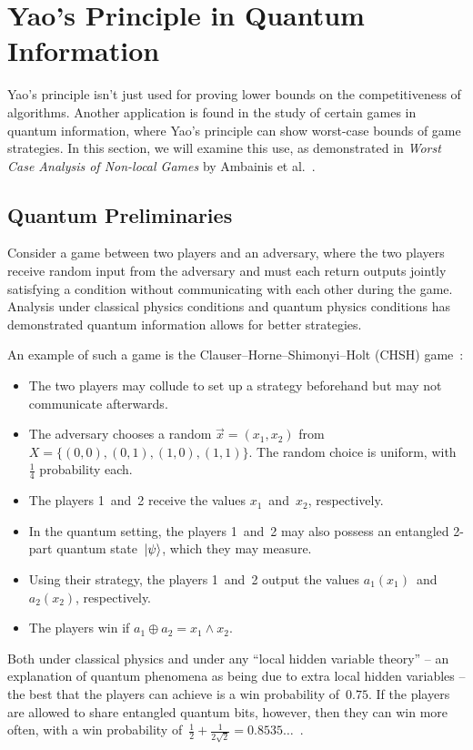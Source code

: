 \newcommand{\Mid}{\nobreak\mid\nobreak}

\section{Yao's Principle in Quantum Information}

Yao's principle isn't just used for proving lower bounds on the competitiveness of algorithms. Another application is found in the study of certain games in quantum information, where Yao's principle can show worst-case bounds of game strategies. In this section, we will examine this use, as demonstrated in \emph{Worst Case Analysis of Non-local Games} by Ambainis et al.~\cite{ABBSSV}.

\subsection{Quantum Preliminaries}

Consider a game between two players and an adversary, where the two players receive random input from the adversary and must each return outputs jointly satisfying a condition without communicating with each other during the game. Analysis under classical physics conditions and quantum physics conditions has demonstrated quantum information allows for better strategies.

An example of such a game is the Clauser--Horne--Shimonyi--Holt (CHSH) game~\cite{CHSH}:

\begin{itemize}
\item{The two players may collude to set up a strategy beforehand but may not communicate afterwards.}
\item{The adversary chooses a random $\vec{x}=(x_1, x_2)$ from~$X=\{(0,0), (0,1), (1,0), (1,1)\}$. The random choice is uniform, with $\frac14$ probability each.}
\item{The players 1~and~2 receive the values $x_1$~and~$x_2$, respectively.}
\item{In the quantum setting, the players 1~and~2 may also possess an entangled 2-part quantum state~$\ket{\psi}$, which they may measure.}
\item{Using their strategy, the players 1~and~2 output the values $a_1(x_1)$~and~$a_2(x_2)$, respectively.}
\item{The players win if $a_1 \oplus a_2 = x_1 \wedge x_2$.}
\end{itemize}

Both under classical physics and under any ``local hidden variable theory'' -- an explanation of quantum phenomena as being due to extra local hidden variables -- the best that the players can achieve is a win probability of~$0.75$. If the players are allowed to share entangled quantum bits, however, then they can win more often, with a win probability of~$\frac12 + \frac1{2\sqrt2} = 0.8535\ldots$~\cite{ABBSSV,CHSH}.


